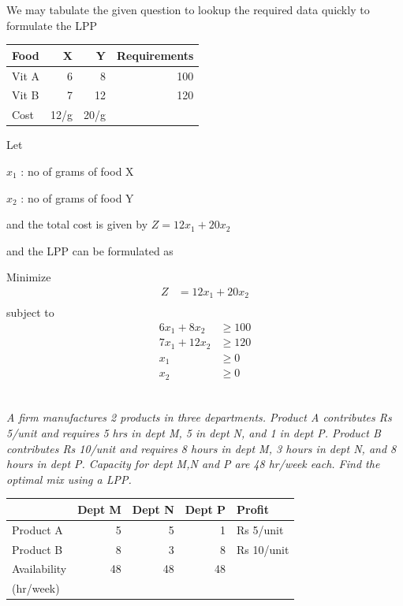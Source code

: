 \documentclass[12pt]{article}
\begin{document}
We may tabulate the given question to lookup the required data quickly to formulate the LPP


\begin{center}
\begin{tabular}{|l|rr|r|}
\hline
 Food   &     X  &     Y  &  Requirements  \\
\hline
 Vit A  &     6  &     8  &           100  \\
 Vit B  &     7  &    12  &           120  \\
\hline
 Cost   &  12/g  &  20/g  &                \\
\hline
\end{tabular}
\end{center}



Let 

$x_1$ : no of grams of food X

$x_2$ : no of grams of food Y

and the total cost is given by $Z=12x_1 + 20x_2$

and the LPP can be formulated as 

Minimize 
\begin{align*}
Z            & = 12x_1 + 20x_2 \\
\end{align*}
subject to 
\begin{align*}
6x_1 + 8x_2  & \ge 100         \\
7x_1 + 12x_2 & \ge 120         \\
x_1          & \ge 0           \\
x_2          & \ge 0           \\
\end{align*}
\subsection{}

\emph{A firm manufactures 2 products in three departments. Product A contributes Rs 5/unit and requires 5 hrs in dept M, 5 in dept N, and 1 in dept P. Product B contributes Rs 10/unit and requires 8 hours in dept M, 3 hours in dept N, and 8 hours in dept P. Capacity for dept M,N and P are 48 hr/week each. Find the optimal mix using a LPP.}

\begin{center}
\begin{tabular}{|l|rrr|l|}
\hline
               &  Dept M  &  Dept N  &  Dept P  &  Profit      \\
\hline
 Product A     &       5  &       5  &       1  &  Rs 5/unit   \\
 Product B     &       8  &       3  &       8  &  Rs 10/unit  \\
\hline
 Availability  &      48  &      48  &      48  &              \\
 (hr/week)     &          &          &          &              \\
\hline
\end{tabular}
\end{center}
\end{document}
